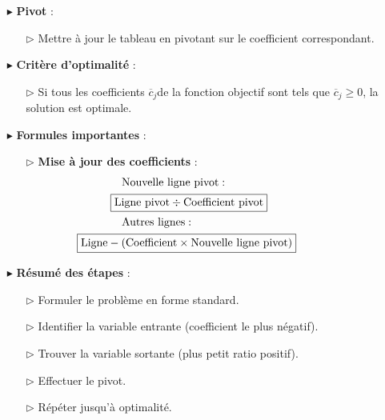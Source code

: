 \documentclass{report}
\begin{document}
\begin{multicols*}{2}
\begin{itemize}
    \item[$\blacktriangleright$] \textbf{Pivot} :
    \begin{itemize}
        \item[$\rhd$] Mettre à jour le tableau en pivotant sur le coefficient correspondant.
    \end{itemize}

    \item[$\blacktriangleright$] \textbf{Critère d'optimalité} :
    \begin{itemize}
        \item[$\rhd$] Si tous les coefficients $\overline{c}_j$de la fonction objectif sont tels que 
            $\overline{c}_j \geq 0$, la solution est optimale.
    \end{itemize}

    \item[$\blacktriangleright$] \textbf{Formules importantes} :
    \begin{itemize}
        \item[$\rhd$] \textbf{Mise à jour des coefficients} :
        \begin{align*}
            & \text{Nouvelle ligne pivot} : 
         \\ &\quad \hspace{-2em}\boxed{\text{Ligne pivot} \div \text{Coefficient pivot}} \\
            & \text{Autres lignes} : 
         \\ &\hspace{-4em}\boxed{\text{Ligne} - (\text{Coefficient} \times \text{Nouvelle ligne pivot})}
        \end{align*}
    \end{itemize}

    \item[$\blacktriangleright$] \textbf{Résumé des étapes} :
    \begin{enumerate}
        \item[$\rhd$] Formuler le problème en forme standard.
        \item[$\rhd$] Identifier la variable entrante (coefficient le plus négatif).
        \item[$\rhd$] Trouver la variable sortante (plus petit ratio positif).
        \item[$\rhd$] Effectuer le pivot.
        \item[$\rhd$] Répéter jusqu'à optimalité.
    \end{enumerate}
\end{itemize}


\end{multicols*}
\end{document}
